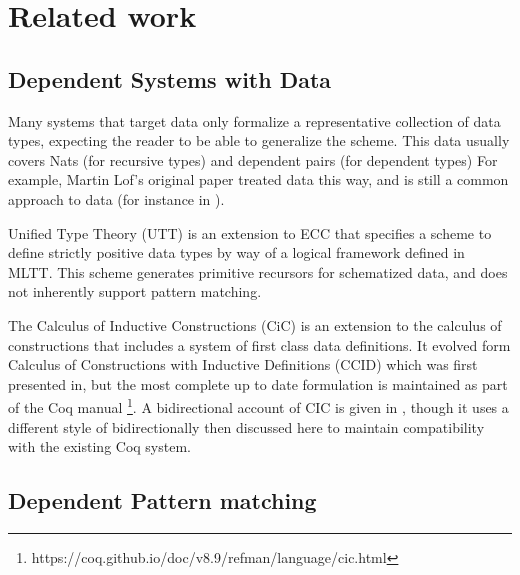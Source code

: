 
\section{Related work}

\subsection{Dependent Systems with Data}

Many systems that target data only formalize a representative collection
of data types, expecting the reader to be able to generalize the scheme.
This data usually covers Nats (for recursive types) and dependent
pairs (for dependent types) %
For example, Martin Lof's original paper treated data
this way, and is still a common approach to data
(for instance in \cite{jia2010dependent}).


Unified Type Theory (UTT)\cite{luo1990extended,luo1994computation}
is an extension to ECC that specifies a scheme to define strictly
positive data types by way of a logical framework defined in MLTT.
This scheme generates primitive recursors for schematized data, and
does not inherently support pattern matching.

The Calculus of Inductive Constructions (CiC) is an extension to the
calculus of constructions that includes a system of first class data
definitions. It evolved form Calculus of Constructions with Inductive
Definitions (CCID) which was first presented in, \cite{10.1007/BFb0037116}
but the most complete up to date formulation is maintained as part
of the Coq manual \footnote{https://coq.github.io/doc/v8.9/refman/language/cic.html}.
A bidirectional account of CIC is given in \cite{lennonbertrand:LIPIcs.ITP.2021.24},
though it uses a different style of bidirectionally then discussed
here to maintain compatibility with the existing Coq system.


\subsection{Dependent Pattern matching}


